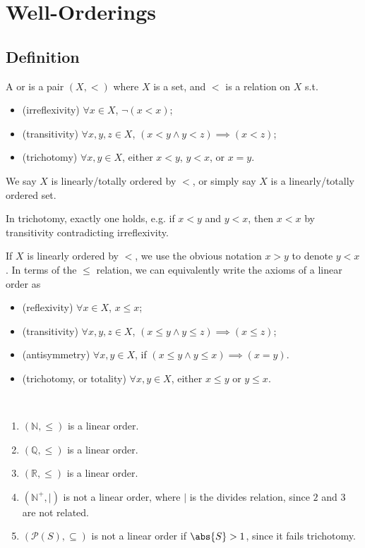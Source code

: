 \section{Well-Orderings}
\subsection{Definition}

\begin{definition}
    A  or  is a pair $(X, <)$ where $X$ is a set, and $<$ is a relation on $X$ s.t.
    \begin{itemize}
        \item (irreflexivity) $\forall x \in X$, $\neg(x < x)$;
        \item (transitivity) $\forall x, y, z \in X$, $(x < y \wedge y < z) \implies (x < z)$;
        \item (trichotomy) $\forall x, y \in X$, either $x < y$, $y < x$, or $x = y$.
    \end{itemize}
    We say $X$ is linearly/totally ordered by $<$, or simply say $X$ is a linearly/totally ordered set.
\end{definition}

\begin{note}
    In trichotomy, exactly one holds, e.g. if $x < y$ and $y < x$, then $x < x$ by transitivity contradicting irreflexivity.
\end{note}

If $X$ is linearly ordered by $<$, we use the obvious notation $x > y$ to denote $y < x$.
In terms of the $\leq$ relation, we can equivalently write the axioms of a linear order as
\begin{itemize}
    \item (reflexivity) $\forall x \in X$, $x \leq x$;
    \item (transitivity) $\forall x, y, z \in X$, $(x \leq y \wedge y \leq z) \implies (x \leq z)$;
    \item (antisymmetry) $\forall x, y \in X$, if $(x \leq y \wedge y \leq x) \implies (x = y)$.
    \item (trichotomy, or totality) $\forall x, y \in X$, either $x \leq y$ or $y \leq x$.
\end{itemize}

\begin{example} ~\vspace*{-1.5\baselineskip}
    \begin{enumerate}
        \item $(\mathbb N, \leq)$ is a linear order.
        \item $(\mathbb Q, \leq)$ is a linear order.
        \item $(\mathbb R, \leq)$ is a linear order.
        \item $(\mathbb N^+, |)$ is not a linear order, where $|$ is the divides relation, since $2$ and $3$ are not related.
        \item $(\mathcal P(S), \subseteq)$ is not a linear order if $\abs{S} > 1$, since it fails trichotomy.
    \end{enumerate}
\end{example}


